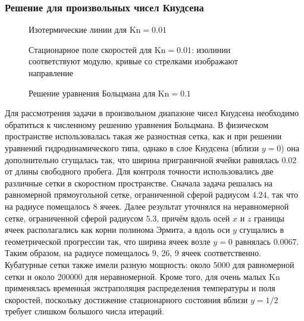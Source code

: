 \documentclass[
aps,%
12pt,%
final,%
notitlepage,%
oneside,%
onecolumn,%
nobibnotes,%
nofootinbib,%
superscriptaddress,%
noshowpacs,%
centertags]%
{revtex4}
\newcommand{\Kn}{\mathrm{Kn}}
\begin{document}
\subsubsection{Решение для произвольных чисел Кнудсена}

\begin{figure}
    \centering
    \caption{Изотермические линии для \(\Kn=0.01\)}
    \label{fig:kn0.01:temp}
\end{figure}

\begin{figure}
    \centering
    \caption{Стационарное поле скоростей для \(\Kn=0.01\):
        изолинии соответствуют модулю, кривые со стрелками изображают направление}
    \label{fig:kn0.01:flow}
\end{figure}

\begin{figure}
    \centering
    \caption{Решение уравнения Больцмана для \(\Kn=0.1\)}
    \label{fig:kn0.1}
\end{figure}

Для рассмотрения задачи в произвольном диапазоне чисел Кнудсена необходимо
обратиться к численному решению уравнения Больцмана.
В физическом пространстве использовалась такая же разностная сетка,
как и при решении уравнений гидродинамического типа,
однако в слое Кнудсена (вблизи \(y=0\)) она дополнительно сгущалась так,
что ширина приграничной ячейки равнялась \(0.02\) от длины свободного пробега.
Для контроля точности использовались две различные сетки в скоростном пространстве.
Сначала задача решалась на равномерной прямоугольной сетке, ограниченной сферой радиусом \(4.24\),
так что на радиусе помещалось 8 ячеек.
Далее результат уточнялся на неравномерной сетке, ограниченной сферой радиусом \(5.3\),
причём вдоль осей \(x\) и \(z\) границы ячеек располагались как корни полинома Эрмита,
а вдоль оси \(y\) сгущались в геометрической прогрессии так,
что ширина ячеек возле \(y=0\) равнялась \(0.0067\).
Таким образом, на радиусе помещалось 9, 26, 9 ячеек соответственно.
Кубатурные сетки также имели разную мощность: около 5000 для равномерной сетки
и около 200000 для неравномерной.
Кроме того, для очень малых \(\Kn\) применялась временн\'{а}я экстраполяция распределения температуры
и поля скоростей, поскольку достижение стационарного состояния вблизи \(y=1/2\)
требует слишком большого числа итераций.
\end{document}
